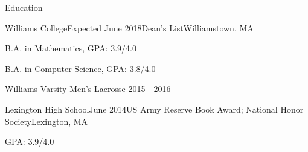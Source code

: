 \documentclass{resume} %
\begin{document}

\begin{rSection}{Education}
  \begin{rSubsection}{Williams College}{Expected June 2018}{Dean's List}{Williamstown, MA}
    \item B.A. in Mathematics, GPA: 3.9/4.0
    \item B.A. in Computer Science, GPA: 3.8/4.0
    \item Williams Varsity Men's Lacrosse 2015 - 2016
  \end{rSubsection}

  \begin{rSubsection}{Lexington High School}{June 2014}{US Army Reserve Book Award; National Honor Society}{Lexington, MA}
    \item GPA: 3.9/4.0
  \end{rSubsection}



\end{rSection}

\end{document}
